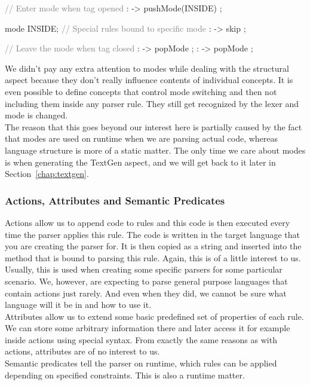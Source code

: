 \begin{antlr}
	\textcolor{gray}{// Enter mode when tag opened}
	        :   \literal{<}       -> pushMode(INSIDE) ;

	mode INSIDE;
	\textcolor{gray}{// Special rules bound to specific mode}
	           :    -> skip ;

	\textcolor{gray}{// Leave the mode when tag closed}
	       :   \literal{>}       -> popMode ;
	 :   \literal{/>}      -> popMode ;
\end{antlr}

We didn't pay any extra attention to modes while dealing with the structural aspect because they don't really influence contents of individual concepts.
It is even possible to define concepts that control mode switching and then not including them inside any parser rule.
They still get recognized by the lexer and mode is changed.
\\

The reason that this goes beyond our interest here is partially caused by the fact that modes are used on runtime when we are parsing actual code, whereas language structure is more of a static matter.
The only time we care about modes is when generating the TextGen aspect, and we will get back to it later in Section~\ref{chap:textgen}.

\subsubsection{Actions, Attributes and Semantic Predicates}

Actions allow us to append code to rules and this code is then executed every time the parser applies this rule.
The code is written in the target language that you are creating the parser for.
It is then copied as a string and inserted into the method that is bound to parsing this rule.
Again, this is of a little interest to us.
Usually, this is used when creating some specific parsers for some particular scenario.
We, however, are expecting to parse general purpose languages that contain actions just rarely.
And even when they did, we cannot be sure what language will it be in and how to use it.
\\

Attributes allow us to extend some basic predefined set of properties of each rule.
We can store some arbitrary information there and later access it for example inside actions using special syntax.
From exactly the same reasons as with actions, attributes are of no interest to us.
\\

Semantic predicates tell the parser on runtime, which rules can be applied depending on specified constraints.
This is also a runtime matter.
